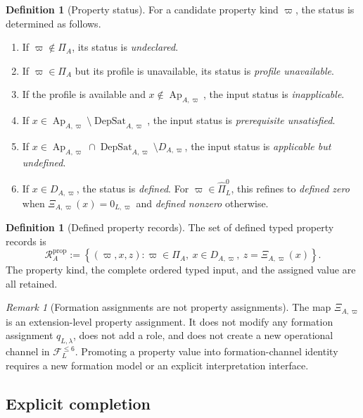 \documentclass[11pt]{article}
\newcommand{\FVI}{\mathcal F_{L}^{\le 6}}
\newcommand{\PiZero}{\widehat{\Pi}_{L}^{0}}
\newcommand{\Ap}{\operatorname{Ap}}
\newcommand{\DepSat}{\operatorname{DepSat}}
\newcommand{\PropRec}{\mathcal R^{\mathrm{prop}}}
\theoremstyle{definition}
\newtheorem{definition}[theorem]{Definition}
\theoremstyle{remark}
\newtheorem{remark}[theorem]{Remark}
\begin{document}
\begin{definition}[Property status]
\label{def:status}
For a candidate property kind \(\varpi\), the status is determined as follows.
\begin{enumerate}[label=(\arabic*)]
\item If \(\varpi\notin\Pi_A\), its status is \emph{undeclared}.
\item If \(\varpi\in\Pi_A\) but its profile is unavailable, its status is \emph{profile unavailable}.
\item If the profile is available and \(x\notin\Ap_{A,\varpi}\), the input status is \emph{inapplicable}.
\item If \(x\in\Ap_{A,\varpi}\setminus\DepSat_{A,\varpi}\), the input status is \emph{prerequisite unsatisfied}.
\item If \(x\in\Ap_{A,\varpi}\cap\DepSat_{A,\varpi}\setminus D_{A,\varpi}\), the input status is \emph{applicable but undefined}.
\item If \(x\in D_{A,\varpi}\), the status is \emph{defined}. For \(\varpi\in\PiZero\), this refines to \emph{defined zero} when \(\Xi_{A,\varpi}(x)=0_{L,\varpi}\) and \emph{defined nonzero} otherwise.
\end{enumerate}
\end{definition}

\begin{definition}[Defined property records]
The set of defined typed property records is
\[
\PropRec_A:=
\left\{
(\varpi,x,z):
\varpi\in\Pi_A,
\ x\in D_{A,\varpi},
\ z=\Xi_{A,\varpi}(x)
\right\}.
\]
The property kind, the complete ordered typed input, and the assigned value are all retained.
\end{definition}

\begin{remark}[Formation assignments are not property assignments]
The map \(\Xi_{A,\varpi}\) is an extension-level property assignment.
It does not modify any formation assignment \(q_{L,\lambda}\), does not add a role, and does not create a new operational channel in \(\FVI\).
Promoting a property value into formation-channel identity requires a new formation model or an explicit interpretation interface.
\end{remark}

\subsection{Explicit completion}
\end{document}
